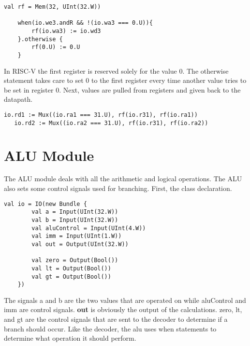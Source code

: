 \documentclass[12pt, letterpaper]{report}
\begin{document}
\begin{lstlisting}[style=scala]
   val rf = Mem(32, UInt(32.W))

    when(io.we3.andR && !(io.wa3 === 0.U)){
        rf(io.wa3) := io.wd3
    }.otherwise {
        rf(0.U) := 0.U
    }
\end{lstlisting}

In RISC-V the first register is reserved solely for the value 0. The otherwise statement takes care to set 0
to the first register every time another value tries to be set in register 0. Next, values are pulled from registers
and given back to the datapath.

\begin{lstlisting}[style=scala]
   io.rd1 := Mux((io.ra1 === 31.U), rf(io.r31), rf(io.ra1))
   io.rd2 := Mux((io.ra2 === 31.U), rf(io.r31), rf(io.ra2))
\end{lstlisting}

\section{ALU Module}

The ALU module deals with all the arithmetic and logical operations. The ALU also sets some control signals
used for branching. First, the class declaration.

\begin{lstlisting}[style=scala]
   val io = IO(new Bundle {
        val a = Input(UInt(32.W))
        val b = Input(UInt(32.W))
        val aluControl = Input(UInt(4.W))
        val imm = Input(UInt(1.W))
        val out = Output(UInt(32.W))

        val zero = Output(Bool())
        val lt = Output(Bool())
        val gt = Output(Bool())
    })
\end{lstlisting}

The signals a and b are the two values that are operated on while aluControl and imm are control signals. \textbf{out}
is obviously the output of the calculations. zero, lt, and gt are the control signals that are sent to the decoder to
determine if a branch should occur. Like the decoder, the alu uses when statements to determine what operation it should perform.
\end{document}
